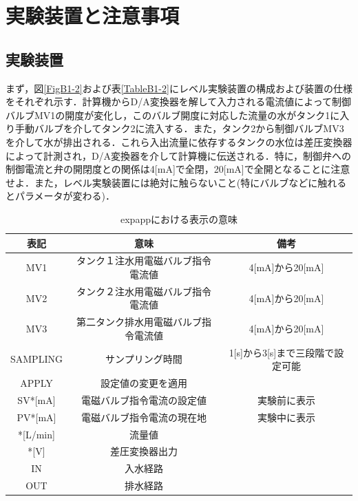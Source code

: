 \documentclass[12pt]{jsarticle}
\begin{document}
\section{実験装置と注意事項}
\subsection{実験装置}

まず，図\ref{FigB1-2}および表\ref{TableB1-2}にレベル実験装置の構成および装置の仕様をそれぞれ示す．計算機からD/A変換器を解して入力される電流値によって制御バルブMV1の開度が変化し，このバルブ開度に対応した流量の水がタンク1に入り手動バルブを介してタンク2に流入する．また，タンク2から制御バルブMV3を介して水が排出される．これら入出流量に依存するタンクの水位は差圧変換器によって計測され，D/A変換器を介して計算機に伝送される．特に，制御弁への制御電流と弁の開閉度との関係は4[mA]で全閉，20[mA]で全開となることに注意せよ．また，レベル実験装置には絶対に触らないこと(特にバルブなどに触れるとパラメータが変わる)．
\begin{table}[tb]
  \label{TableB1-1}
  \caption{expappにおける表示の意味}
  \begin{tabular}{c|c|c} \hline
    表記 & 意味 & 備考\\ \hline \hline
    MV1 & タンク１注水用電磁バルブ指令電流値 & 4[mA]から20[mA] \\ \hline
    MV2 & タンク２注水用電磁バルブ指令電流値 & 4[mA]から20[mA] \\ \hline
    MV3 & 第二タンク排水用電磁バルブ指令電流値 & 4[mA]から20[mA] \\ \hline
    SAMPLING & サンプリング時間 & 1[s]から3[s]まで三段階で設定可能 \\ \hline
    APPLY & 設定値の変更を適用 & \\ \hline
    SV*[mA] & 電磁バルブ指令電流の設定値 & 実験前に表示 \\ \hline
    PV*[mA] & 電磁バルブ指令電流の現在地 & 実験中に表示 \\ \hline
    *[L/min] & 流量値 & \\ \hline
    *[V] & 差圧変換器出力 & \\ \hline
    IN & 入水経路 & \\ \hline
    OUT & 排水経路 & \\ \hline
  \end{tabular}
\end{table}
\end{document}
